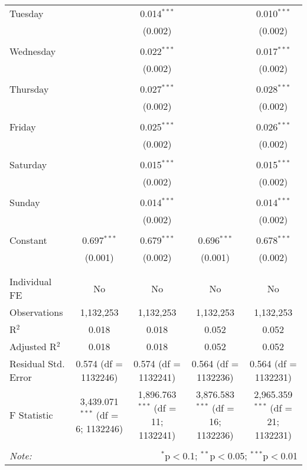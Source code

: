 \documentclass[
]{article}
\begin{document}
\begin{table}[!htbp]
{\begin{tabular}{@{\extracolsep{5pt}}lcccc}
 Tuesday &  & 0.014$^{***}$ &  & 0.010$^{***}$ \\ 
  &  & (0.002) &  & (0.002) \\ 
  & & & & \\ 
 Wednesday &  & 0.022$^{***}$ &  & 0.017$^{***}$ \\ 
  &  & (0.002) &  & (0.002) \\ 
  & & & & \\ 
 Thursday &  & 0.027$^{***}$ &  & 0.028$^{***}$ \\ 
  &  & (0.002) &  & (0.002) \\ 
  & & & & \\ 
 Friday &  & 0.025$^{***}$ &  & 0.026$^{***}$ \\ 
  &  & (0.002) &  & (0.002) \\ 
  & & & & \\ 
 Saturday &  & 0.015$^{***}$ &  & 0.015$^{***}$ \\ 
  &  & (0.002) &  & (0.002) \\ 
  & & & & \\ 
 Sunday &  & 0.014$^{***}$ &  & 0.014$^{***}$ \\ 
  &  & (0.002) &  & (0.002) \\ 
  & & & & \\ 
 Constant & 0.697$^{***}$ & 0.679$^{***}$ & 0.696$^{***}$ & 0.678$^{***}$ \\ 
  & (0.001) & (0.002) & (0.001) & (0.002) \\ 
  & & & & \\ 
\hline \\[-1.8ex] 
Individual FE & No & No & No & No \\ 
Observations & 1,132,253 & 1,132,253 & 1,132,253 & 1,132,253 \\ 
R$^{2}$ & 0.018 & 0.018 & 0.052 & 0.052 \\ 
Adjusted R$^{2}$ & 0.018 & 0.018 & 0.052 & 0.052 \\ 
Residual Std. Error & 0.574 (df = 1132246) & 0.574 (df = 1132241) & 0.564 (df = 1132236) & 0.564 (df = 1132231) \\ 
F Statistic & 3,439.071$^{***}$ (df = 6; 1132246) & 1,896.763$^{***}$ (df = 11; 1132241) & 3,876.583$^{***}$ (df = 16; 1132236) & 2,965.359$^{***}$ (df = 21; 1132231) \\ 
\hline 
\hline \\[-1.8ex] 
\textit{Note:}  & \multicolumn{4}{r}{$^{*}$p$<$0.1; $^{**}$p$<$0.05; $^{***}$p$<$0.01} \\ 
\end{tabular}
} 
\end{table} 
\newpage
\end{document}
